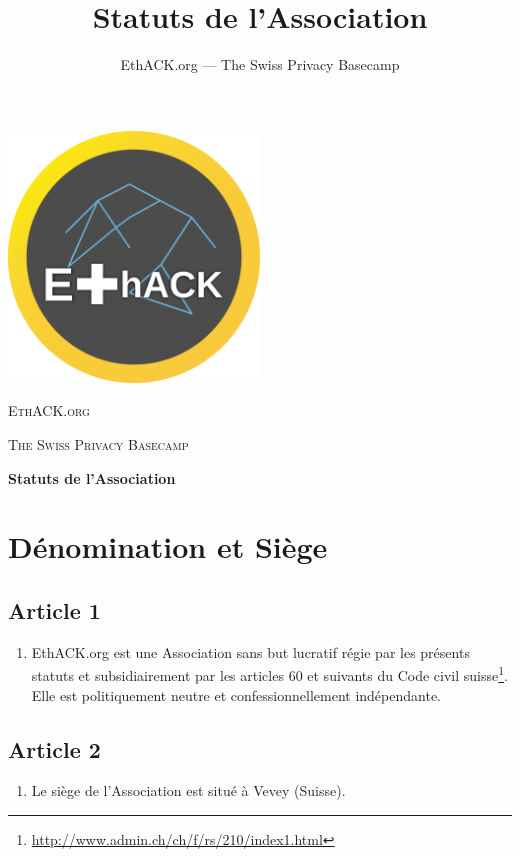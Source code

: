 \documentclass[12pt,twoside]{report}
\author{EthACK.org — The Swiss Privacy Basecamp}
\title{Statuts de l'Association}
\begin{document}
\begin{titlepage}
\centering
\vspace{1cm}
\includegraphics[width=0.50\textwidth]{../logo-4096.png}\par\vspace{2cm}
{\scshape\LARGE EthACK.org \par}
\vspace{1cm}
{\scshape\Large The Swiss Privacy Basecamp \par}
\vspace{1.5cm}
{\huge\bfseries Statuts de l'Association\par}

\vfill
\end{titlepage}

\tableofcontents
\newpage


\setlength{\parindent}{0cm}

\section*{Dénomination et Siège}

\subsection*{Article 1}
\begin{enumerate}
\item EthACK.org est une Association sans but lucratif régie par les présents statuts et subsidiairement par les articles 60 et suivants du Code civil suisse\footnote{\url{http://www.admin.ch/ch/f/rs/210/index1.html}}. Elle est politiquement neutre et confessionnellement indépendante.
\end{enumerate}

\subsection*{Article 2}
\begin{enumerate}
\item Le siège de l’Association est situé à Vevey (Suisse).
\end{enumerate}
\end{document}
